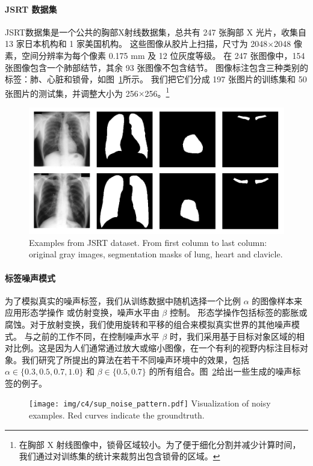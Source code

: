 \paragraph{JSRT 数据集}
JSRT数据集\citep{Shiraishi2000DevelopmentOA,Ginneken2006SegmentationOA}是一个公共的胸部X射线数据集，总共有 247 张胸部 X 光片，收集自 13 家日本机构和 1 家美国机构。
这些图像从胶片上扫描，尺寸为 2048$\times$2048 像素，空间分辨率为每个像素 0.175 mm 及 12 位灰度等级。
在 247 张图像中，154 张图像包含一个肺部结节，其余 93 张图像不包含结节。
图像标注包含三种类别的标签：肺、心脏和锁骨，如图~\ref{fig:jsrt_intro}所示。
我们把它们分成 197 张图片的训练集和 50 张图片的测试集，并调整大小为 256$\times$256。\footnote{在胸部 X 射线图像中，锁骨区域较小。为了便于细化分割并减少计算时间，我们通过对训练集的统计来裁剪出包含锁骨的区域。}
    \begin{figure}[tbp]
        \centering 
        \includegraphics[width=1.0\textwidth]{img/c4/c_jsrt.png}
        {Examples from JSRT dataset. From first column to last column: original gray images, segmentation masks of lung, heart and clavicle.}
        \label{fig:jsrt_intro}
    \end{figure}

\paragraph{标签噪声模式}
为了模拟真实的噪声标签，我们从训练数据中随机选择一个比例 $\alpha$ 的图像样本来应用形态学操作\citep{Zhu2019PickandLearnAQ, Zhang2020CharacterizingLE,Zhang2020RobustMI,Xue2020CascadedRL} 或仿射变换，噪声水平由 $\beta$ 控制。
形态学操作包括标签的膨胀或腐蚀。对于放射变换，我们使用旋转和平移的组合来模拟真实世界的其他噪声模式。
与之前的工作不同，在控制噪声水平 $\beta$ 时，我们采用基于目标对象区域的相对比例。这是因为人们通常通过放大或缩小图像，在一个有利的视野内标注目标对象。我们研究了所提出的算法在若干不同噪声环境中的效果，包括 $\alpha \in \{ 0.3, 0.5, 0.7, 1.0 \}$ 和 $\beta \in \{0.5, 0.7\}$ 的所有组合。图~\ref{fig:noise_pattern}给出一些生成的噪声标签的例子。
\begin{figure}[tbp]
	\centering 
	\texttt{[image: img/c4/sup\_noise\_pattern.pdf]}
    {Visualization of noisy examples. Red curves indicate the groundtruth.}
	\label{fig:noise_pattern}
\end{figure}


